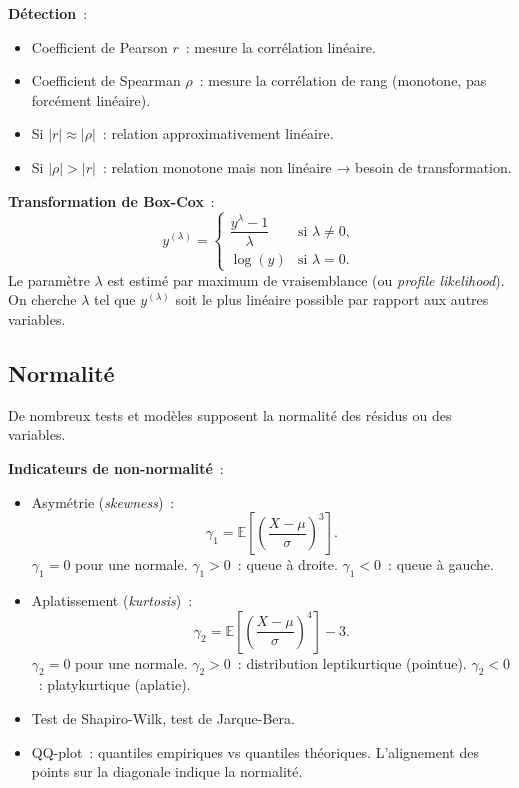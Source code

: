 \documentclass[a4paper,11pt]{article}
\theoremstyle{definition}
\theoremstyle{remark}
\begin{document}
\textbf{Détection}~:
\begin{itemize}
  \item Coefficient de Pearson $r$~: mesure la corrélation linéaire.
  \item Coefficient de Spearman $\rho$~: mesure la corrélation de rang
    (monotone, pas forcément linéaire).
  \item Si $|r| \approx |\rho|$~: relation approximativement linéaire.
  \item Si $|\rho| > |r|$~: relation monotone mais non linéaire → besoin
    de transformation.
\end{itemize}

\textbf{Transformation de Box-Cox}~:
\[
y^{(\lambda)} =
\begin{cases}
  \dfrac{y^\lambda - 1}{\lambda} & \text{si } \lambda \neq 0,\\[6pt]
  \log(y)                         & \text{si } \lambda = 0.
\end{cases}
\]
Le paramètre $\lambda$ est estimé par maximum de vraisemblance (ou
\textit{profile likelihood}). On cherche $\lambda$ tel que $y^{(\lambda)}$
soit le plus linéaire possible par rapport aux autres variables.

\subsection{Normalité}

De nombreux tests et modèles supposent la normalité des résidus ou des
variables.

\textbf{Indicateurs de non-normalité}~:
\begin{itemize}
  \item Asymétrie (\textit{skewness})~:
    \[
    \gamma_1 = \mathbb{E}\!\left[\left(\frac{X-\mu}{\sigma}\right)^{\!3}\right].
    \]
    $\gamma_1 = 0$ pour une normale. $\gamma_1 > 0$~: queue à droite.
    $\gamma_1 < 0$~: queue à gauche.
  \item Aplatissement (\textit{kurtosis})~:
    \[
    \gamma_2 = \mathbb{E}\!\left[\left(\frac{X-\mu}{\sigma}\right)^{\!4}\right] - 3.
    \]
    $\gamma_2 = 0$ pour une normale. $\gamma_2 > 0$~: distribution
    leptikurtique (pointue). $\gamma_2 < 0$~: platykurtique (aplatie).
  \item Test de Shapiro-Wilk, test de Jarque-Bera.
  \item QQ-plot~: quantiles empiriques vs quantiles théoriques.
    L'alignement des points sur la diagonale indique la normalité.
\end{itemize}
\end{document}
